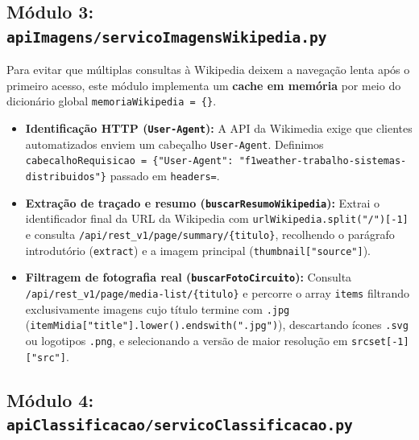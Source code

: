 \documentclass[12pt]{article}
\begin{document}
\subsection{Módulo 3: \texttt{apiImagens/servicoImagensWikipedia.py}}

Para evitar que múltiplas consultas à Wikipedia deixem a navegação lenta após o primeiro acesso, este módulo implementa um \textbf{cache em memória} por meio do dicionário global \texttt{memoriaWikipedia = \{\}}.
\begin{itemize}
    \item \textbf{Identificação HTTP (\texttt{User-Agent}):} A API da Wikimedia exige que clientes automatizados enviem um cabeçalho \texttt{User-Agent}. Definimos \texttt{cabecalhoRequisicao = \{"User-Agent": "f1weather-trabalho-sistemas-distribuidos"\}} passado em \texttt{headers=}.
    \item \textbf{Extração de traçado e resumo (\texttt{buscarResumoWikipedia}):} Extrai o identificador final da URL da Wikipedia com \texttt{urlWikipedia.split("/")[-1]} e consulta \texttt{/api/rest\_v1/page/summary/\{titulo\}}, recolhendo o parágrafo introdutório (\texttt{extract}) e a imagem principal (\texttt{thumbnail["source"]}).
    \item \textbf{Filtragem de fotografia real (\texttt{buscarFotoCircuito}):} Consulta \texttt{/api/rest\_v1/page/media-list/\{titulo\}} e percorre o array \texttt{items} filtrando exclusivamente imagens cujo título termine com \texttt{.jpg} (\texttt{itemMidia["title"].lower().endswith(".jpg")}), descartando ícones \texttt{.svg} ou logotipos \texttt{.png}, e selecionando a versão de maior resolução em \texttt{srcset[-1]["src"]}.
\end{itemize}

\subsection{Módulo 4: \texttt{apiClassificacao/servicoClassificacao.py}}
\end{document}
